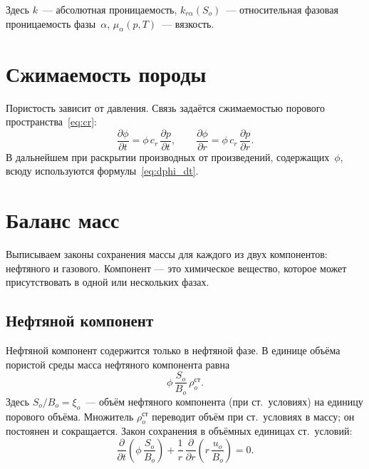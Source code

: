 \documentclass[12pt,a4paper]{article}
\begin{document}
Здесь $k$~--- абсолютная проницаемость, $k_{r\alpha}(S_o)$~--- относительная
фазовая проницаемость фазы~$\alpha$, $\mu_\alpha(p,T)$~--- вязкость.


\section{Сжимаемость породы}\label{sec:rock_compr}

Пористость зависит от давления. Связь задаётся сжимаемостью порового
пространства~\eqref{eq:cr}:
\begin{equation}\label{eq:dphi_dt}
  \frac{\partial\phi}{\partial t} = \phi\,c_r\,\frac{\partial p}{\partial t},
  \qquad
  \frac{\partial\phi}{\partial r} = \phi\,c_r\,\frac{\partial p}{\partial r}.
\end{equation}
В дальнейшем при раскрытии производных от произведений, содержащих~$\phi$,
всюду используются формулы~\eqref{eq:dphi_dt}.


\section{Баланс масс}\label{sec:mass}

Выписываем законы сохранения массы для каждого из двух компонентов:
нефтяного и газового. Компонент --- это химическое вещество, которое
может присутствовать в одной или нескольких фазах.

\subsection{Нефтяной компонент}\label{ssec:mass_oil}

Нефтяной компонент содержится только в нефтяной фазе. В единице
объёма пористой среды масса нефтяного компонента равна
\[
  \phi\,\frac{S_o}{B_o}\,\rho_o^{\text{ст}}.
\]
Здесь $S_o/B_o = \xi_o$~--- объём нефтяного компонента (при ст.~условиях)
на единицу порового объёма. Множитель $\rho_o^{\text{ст}}$ переводит
объём при ст.~условиях в массу; он постоянен и сокращается. Закон
сохранения в объёмных единицах ст.~условий:
\begin{equation}\label{eq:mass_oil}
  \boxed{
    \frac{\partial}{\partial t}\!\left(\phi\,\frac{S_o}{B_o}\right)
    + \frac{1}{r}\,\frac{\partial}{\partial r}\!
      \left(r\,\frac{u_o}{B_o}\right) = 0.
  }
\end{equation}
\end{document}

